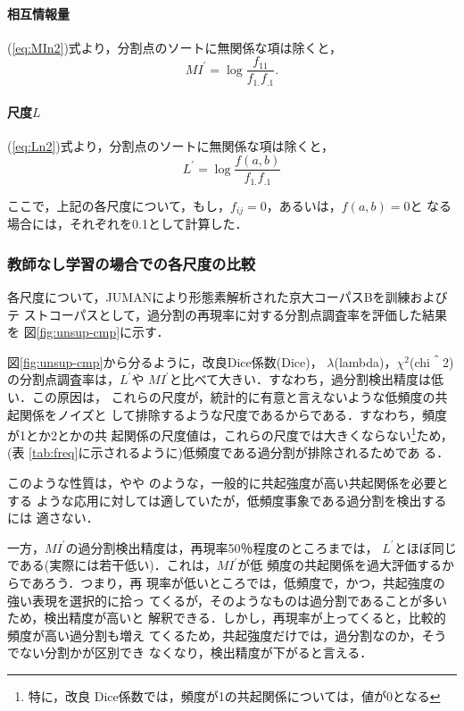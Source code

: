 \paragraph{相互情報量}
(\ref{eq:MIn2})式より，分割点のソートに無関係な項は除くと，
\begin{equation}
  \label{eq:mi2}
  MI^\prime = \log \frac{f_{11}}{f_{1.}f_{.1}}.
\end{equation}

\paragraph{尺度$L$}
(\ref{eq:Ln2})式より，分割点のソートに無関係な項は除くと，
\begin{equation}
  \label{eq:L2}
  L^\prime = \log \frac{f(a,b)}{f_{1.}f_{.1}}
\end{equation}

ここで，上記の各尺度について，もし，$f_{ij}=0$，あるいは，$f(a,b)=0$と
なる場合には，それぞれを0.1として計算した．

\subsubsection*{教師なし学習の場合での各尺度の比較}

各尺度について，JUMANにより形態素解析された京大コーパスBを訓練およびテ
ストコーパスとして，過分割の再現率に対する分割点調査率を評価した結果を
図\ref{fig:unsup-cmp}に示す．

図\ref{fig:unsup-cmp}から分るように，改良Dice係数(Dice)，
$\lambda$(lambda)，$\chi^2$(chi＾2)の分割点調査率は，$L^\prime$や
$MI^\prime$と比べて大きい．すなわち，過分割検出精度は低い．この原因は，
これらの尺度が，統計的に有意と言えないような低頻度の共起関係をノイズと
して排除するような尺度であるからである．すなわち，頻度が1とか2とかの共
起関係の尺度値は，これらの尺度では大きくならない\footnote{特に，改良
  Dice係数では，頻度が1の共起関係については，値が0となる}ため，(表
\ref{tab:freq}に示されるように)低頻度である過分割が排除されるためであ
る．

このような性質は，\cite{hisamitsu97}や\cite{kageura97}や
\cite{kitamura97}のような，一般的に共起強度が高い共起関係を必要とする
ような応用に対しては適していたが，低頻度事象である過分割を検出するには
適さない．

一方，$MI^\prime$の過分割検出精度は，再現率50％程度のところまでは，
$L^\prime$とほぼ同じである(実際には若干低い)．これは，$MI^\prime$が低
頻度の共起関係を過大評価する\cite{hisamitsu97}からであろう．つまり，再
現率が低いところでは，低頻度で，かつ，共起強度の強い表現を選択的に拾っ
てくるが，そのようなものは過分割であることが多いため，検出精度が高いと
解釈できる．しかし，再現率が上ってくると，比較的頻度が高い過分割も増え
てくるため，共起強度だけでは，過分割なのか，そうでない分割かが区別でき
なくなり，検出精度が下がると言える．


